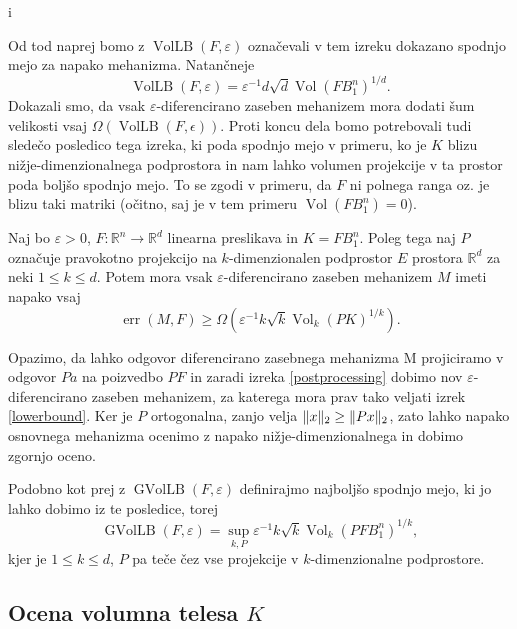 i\documentclass[mat1]{fmfdelo}
\DeclarePairedDelimiter{\norm}{\lVert}{\rVert}
\newcommand{\R}{\mathbb R}
\DeclareMathOperator{\Vol}{Vol}
\DeclareMathOperator*{\err}{err}
\newcommand{\query}{F: \R^n \to \R^d}
\begin{document}
Od tod naprej bomo z $\operatorname{VolLB}(F, \varepsilon)$ označevali v tem izreku dokazano spodnjo mejo za napako mehanizma. Natančneje
\begin{equation*}
    \operatorname{VolLB}(F, \varepsilon)=\varepsilon^{-1}d\sqrt{d}\Vol(FB_1^n)^{1/d}.
\end{equation*}
Dokazali smo, da vsak $\varepsilon$-diferencirano zaseben mehanizem mora dodati šum velikosti vsaj $\Omega(\operatorname{VolLB}(F,\epsilon))$. Proti koncu dela bomo potrebovali tudi sledečo posledico tega izreka, ki poda spodnjo mejo v primeru, ko je $K$ blizu nižje-dimenzionalnega podprostora in nam lahko volumen projekcije v ta prostor poda boljšo spodnjo mejo. To se zgodi v primeru, da $F$ ni polnega ranga oz. je blizu taki matriki (očitno, saj je v tem primeru $\Vol(FB_1^n)=0$).

\begin{posledica}
    Naj bo $\varepsilon > 0$, $\query$ linearna preslikava in $K=FB_1^n$. Poleg tega naj $P$ označuje pravokotno projekcijo na $k$-dimenzionalen podprostor $E$ prostora $\R^d$ za neki $1 \leq k \leq d$. Potem mora vsak $\varepsilon$-diferencirano zaseben mehanizem $M$ imeti napako vsaj
    \begin{equation*}
        \err(M, F) \geq \Omega(\varepsilon^{-1} k \sqrt{k} \Vol_k(PK)^{1/k}).
    \end{equation*}
\end{posledica}
\begin{dokaz}
    Opazimo, da lahko odgovor diferencirano zasebnega mehanizma M projiciramo v odgovor $Pa$ na poizvedbo $PF$ in zaradi izreka \ref{postprocessing} dobimo nov $\varepsilon$-diferen\-cirano zaseben mehanizem, za katerega mora prav tako veljati izrek \ref{lowerbound}. Ker je $P$ ortogonalna, zanjo velja $\norm{x}_2 \geq \norm{Px}_2$, zato lahko napako osnovnega mehanizma ocenimo z napako nižje-dimenzionalnega in dobimo zgornjo oceno.
\end{dokaz}

Podobno kot prej z $\operatorname{GVolLB}(F,\varepsilon)$ definirajmo najboljšo spodnjo mejo, ki jo lahko dobimo iz te posledice, torej
\begin{equation*}
    \operatorname{GVolLB}(F,\varepsilon) = \sup_{k, P} \varepsilon^{-1} k \sqrt{k} \Vol_k(PFB_1^n)^{1/k},
\end{equation*}
kjer je $1 \leq k \leq d$, $P$ pa teče čez vse projekcije v $k$-dimenzionalne podprostore.

\subsection{Ocena volumna telesa $K$} 
\end{document}
